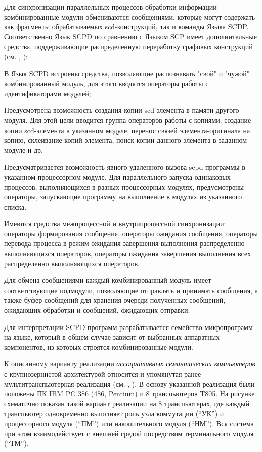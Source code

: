 \begin{textitemize}
	\item Для синхронизации параллельных процессов обработки информации комбинированные модули обмениваются сообщениями, которые могут содержать как фрагменты обрабатываемых scd-конструкций, так и команды Языка SCDP. Соответственно Язык SCPD по сравнению с Языком SCP имеет дополнительные средства, поддерживающие распределенную переработку графовых конструкций (см. , ):
	\begin{textitemize}
		\item В Язык SCPD встроены средства, позволяющие распознавать "свой"{} и "чужой"{} комбинированный модуль, для этого вводятся операторы работы с идентификаторами модулей;
		\item Предусмотрена возможность создания копии scd-элемента в памяти другого модуля. Для этой цели вводится группа операторов работы с копиями: создание копии scd-элемента в указанном модуле, перенос связей элемента-оригинала на копию, склеивание копий элемента, поиск копии данного элемента в заданном модуле и др.
		\item Предусматривается возможность явного удаленного вызова scpd-программы в указанном процессорном модуле. Для параллельного запуска одинаковых процессов, выполняющихся в разных процессорных модулях, предусмотрены операторы, запускающие программу на выполнение в модулях из указанного списка.
		\item Имеются средства межпроцессной и внутрипроцессной синхронизации: операторы формирования сообщения, операторы ожидания сообщения, операторы перевода процесса в режим ожидания завершения выполнения распределенно выполняющихся операторов, операторы ожидания завершения выполнения всех распределенно выполняющихся операторов.
	\end{textitemize}
	\item Для обмена сообщениями каждый комбинированный модуль имеет соответствующие подмодули, позволяющие отправлять и принимать сообщения, а также буфер сообщений для хранения очереди полученных сообщений, ожидающих обработки и сообщений, ожидающих отправки.
	\item Для интерпретации SCPD-программ разрабатывается семейство микропрограмм на языке, который в общем случае зависит от выбранных аппаратных компонентов, из которых строятся комбинированные модули.
\end{textitemize}

К описанному варианту реализации \textit{ассоциативных семантических компьютеров} с крупнозернистой архитектурой относится и упомянутая ранее мультитранспьютерная реализация  (см. , ). В основу указанной реализация были положены ПК IBM PC 386 (486, Pentium) и 8 транспьютеров T805. На рисунке \textit{} схематично показан такой вариант реализации на 8 транспьютерах, где каждый транспьютер одновременно выполняет роль узла коммутации (``УК'') и процессорного модуля (``ПМ'') или накопительного модуля (``НМ''). Вся система при этом взаимодействует с внешней средой посредством терминального модуля (``ТМ'').

